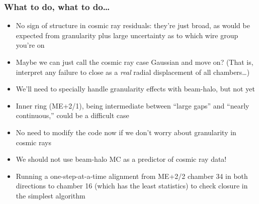 \documentclass[compress]{beamer}
\begin{document}
\begin{frame}
\frametitle{What to do, what to do\ldots}
\small
\begin{itemize}
\item No sign of structure in cosmic ray residuals: they're just
  broad, as would be expected from granularity plus large uncertainty
  as to which wire group you're on
\item Maybe we can just call the cosmic ray case Gaussian and move on?
  (That is, interpret any failure to close as a {\it real} radial
  displacement of all chambers\ldots)
\item We'll need to specially handle granularity effects with
  beam-halo, but not yet
\item Inner ring (ME+2/1), being intermediate between ``large gaps''
  and ``nearly continuous,'' could be a difficult case
\item No need to modify the code now if we don't worry about
  granularity in cosmic rays
\item We should not use beam-halo MC as a predictor of cosmic ray data!
\item Running a one-step-at-a-time alignment from ME+2/2 chamber 34 in
  both directions to chamber 16 (which has the least statistics) to
  check closure in the simplest algorithm
\end{itemize}

\label{numpages}
\end{frame}
\end{document}
